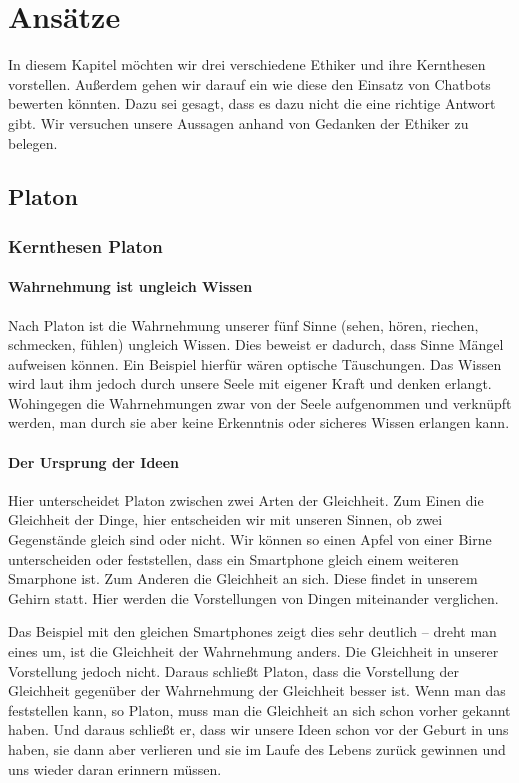 \section{Ansätze}
In diesem Kapitel möchten wir drei verschiedene Ethiker und ihre Kernthesen vorstellen. Außerdem gehen wir darauf ein wie diese den Einsatz von Chatbots bewerten könnten. Dazu sei gesagt, dass es dazu nicht die eine richtige Antwort gibt. Wir versuchen unsere Aussagen anhand von Gedanken der Ethiker zu belegen. 

\subsection{Platon}

\subsubsection{Kernthesen Platon}

\paragraph{Wahrnehmung ist ungleich Wissen} 
Nach Platon ist die Wahrnehmung unserer fünf Sinne (sehen, hören, riechen, schmecken, fühlen) ungleich Wissen. Dies beweist er dadurch, dass Sinne Mängel aufweisen können. Ein Beispiel hierfür wären optische Täuschungen. Das Wissen wird laut ihm jedoch durch unsere Seele mit eigener Kraft und denken erlangt. Wohingegen die Wahrnehmungen zwar von der Seele aufgenommen und verknüpft werden, man durch sie aber keine Erkenntnis oder sicheres Wissen erlangen kann.

\paragraph{Der Ursprung der Ideen} 
Hier unterscheidet Platon zwischen zwei Arten der Gleichheit.
Zum Einen die Gleichheit der Dinge, hier entscheiden wir mit unseren Sinnen, ob zwei Gegenstände gleich sind oder nicht. Wir können so einen Apfel von einer Birne unterscheiden oder feststellen, dass ein Smartphone gleich einem weiteren Smarphone ist.
Zum Anderen die Gleichheit an sich. Diese findet in unserem Gehirn statt. 
Hier werden die Vorstellungen von Dingen miteinander verglichen.

Das Beispiel mit den gleichen Smartphones zeigt dies sehr deutlich -- dreht man eines um, ist die Gleichheit der Wahrnehmung anders. Die Gleichheit in unserer Vorstellung jedoch nicht. Daraus schließt Platon, dass die Vorstellung der Gleichheit gegenüber der Wahrnehmung der Gleichheit besser ist. Wenn man das feststellen kann, so Platon, muss man die Gleichheit an sich schon vorher gekannt haben. Und daraus schließt er, dass wir unsere Ideen schon vor der Geburt in uns haben, sie dann aber verlieren und sie im Laufe des Lebens zurück gewinnen und uns wieder daran erinnern müssen.

